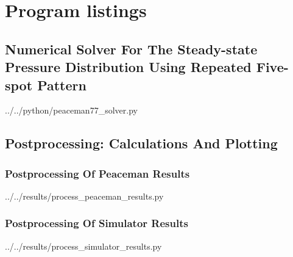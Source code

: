 \section{Program listings} %
\label{sec:program_listings}

\subsection{Numerical Solver For The Steady-state Pressure Distribution Using Repeated Five-spot Pattern} %
\label{sub:numerical_solver_for_the_steady_state_pressure_distribution_using_repeated_five_spot_pattern}


  {../../python/peaceman77_solver.py}

\clearpage
\subsection{Postprocessing: Calculations And Plotting} %
\label{sub:postprocessing_calculations_and_plotting}

\subsubsection{Postprocessing Of Peaceman Results} %
\label{ssub:postprocessing_of_peaceman_results}

  {../../results/process_peaceman_results.py}

\subsubsection{Postprocessing Of Simulator Results} %
\label{ssub:postprocessing_of_simulator_results}

  {../../results/process_simulator_results.py}



